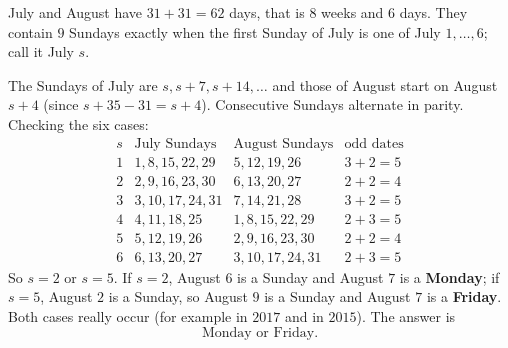July and August have $31+31=62$ days, that is $8$ weeks and $6$ days. They contain $9$ Sundays exactly when the first Sunday of July is one of July $1,\dots,6$; call it July $s$.

The Sundays of July are $s, s+7, s+14,\dots$ and those of August start on August $s+4$ (since $s+35-31=s+4$). Consecutive Sundays alternate in parity. Checking the six cases:
\[
\begin{array}{c|c|c|c}
s & \text{July Sundays} & \text{August Sundays} & \text{odd dates}\\ \hline
1 & 1,8,15,22,29 & 5,12,19,26 & 3+2=5\\
2 & 2,9,16,23,30 & 6,13,20,27 & 2+2=4\\
3 & 3,10,17,24,31 & 7,14,21,28 & 3+2=5\\
4 & 4,11,18,25 & 1,8,15,22,29 & 2+3=5\\
5 & 5,12,19,26 & 2,9,16,23,30 & 2+2=4\\
6 & 6,13,20,27 & 3,10,17,24,31 & 2+3=5
\end{array}
\]
So $s=2$ or $s=5$. If $s=2$, August $6$ is a Sunday and August $7$ is a \textbf{Monday}; if $s=5$, August $2$ is a Sunday, so August $9$ is a Sunday and August $7$ is a \textbf{Friday}. Both cases really occur (for example in $2017$ and in $2015$). The answer is
\[
\boxed{\text{Monday or Friday}}.
\]
